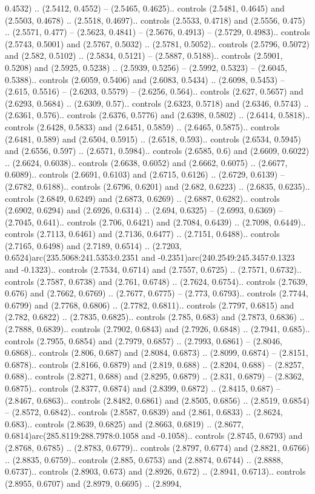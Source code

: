 0.4532) .. (2.5412, 0.4552) -- (2.5465, 0.4625).. controls (2.5481, 0.4645) and (2.5503, 0.4678) .. (2.5518, 0.4697).. controls (2.5533, 0.4718) and (2.5556, 0.475) .. (2.5571, 0.477) -- (2.5623, 0.4841) -- (2.5676, 0.4913) -- (2.5729, 0.4983).. controls (2.5743, 0.5001) and (2.5767, 0.5032) .. (2.5781, 0.5052).. controls (2.5796, 0.5072) and (2.582, 0.5102) .. (2.5834, 0.5121) -- (2.5887, 0.5188).. controls (2.5901, 0.5208) and (2.5925, 0.5238) .. (2.5939, 0.5256) -- (2.5992, 0.5323) -- (2.6045, 0.5388).. controls (2.6059, 0.5406) and (2.6083, 0.5434) .. (2.6098, 0.5453) -- (2.615, 0.5516) -- (2.6203, 0.5579) -- (2.6256, 0.564).. controls (2.627, 0.5657) and (2.6293, 0.5684) .. (2.6309, 0.57).. controls (2.6323, 0.5718) and (2.6346, 0.5743) .. (2.6361, 0.576).. controls (2.6376, 0.5776) and (2.6398, 0.5802) .. (2.6414, 0.5818).. controls (2.6428, 0.5833) and (2.6451, 0.5859) .. (2.6465, 0.5875).. controls (2.6481, 0.589) and (2.6504, 0.5915) .. (2.6518, 0.593).. controls (2.6534, 0.5945) and (2.6556, 0.597) .. (2.6571, 0.5984).. controls (2.6585, 0.6) and (2.6609, 0.6022) .. (2.6624, 0.6038).. controls (2.6638, 0.6052) and (2.6662, 0.6075) .. (2.6677, 0.6089).. controls (2.6691, 0.6103) and (2.6715, 0.6126) .. (2.6729, 0.6139) -- (2.6782, 0.6188).. controls (2.6796, 0.6201) and (2.682, 0.6223) .. (2.6835, 0.6235).. controls (2.6849, 0.6249) and (2.6873, 0.6269) .. (2.6887, 0.6282).. controls (2.6902, 0.6294) and (2.6926, 0.6314) .. (2.694, 0.6325) -- (2.6993, 0.6369) -- (2.7045, 0.641).. controls (2.706, 0.6421) and (2.7084, 0.6439) .. (2.7098, 0.6449).. controls (2.7113, 0.6461) and (2.7136, 0.6477) .. (2.7151, 0.6488).. controls (2.7165, 0.6498) and (2.7189, 0.6514) .. (2.7203, 0.6524)arc(235.5068:241.5353:0.2351 and -0.2351)arc(240.2549:245.3457:0.1323 and -0.1323).. controls (2.7534, 0.6714) and (2.7557, 0.6725) .. (2.7571, 0.6732).. controls (2.7587, 0.6738) and (2.761, 0.6748) .. (2.7624, 0.6754).. controls (2.7639, 0.676) and (2.7662, 0.6769) .. (2.7677, 0.6775) -- (2.773, 0.6793).. controls (2.7744, 0.6799) and (2.7768, 0.6806) .. (2.7782, 0.6811).. controls (2.7797, 0.6815) and (2.782, 0.6822) .. (2.7835, 0.6825).. controls (2.785, 0.683) and (2.7873, 0.6836) .. (2.7888, 0.6839).. controls (2.7902, 0.6843) and (2.7926, 0.6848) .. (2.7941, 0.685).. controls (2.7955, 0.6854) and (2.7979, 0.6857) .. (2.7993, 0.6861) -- (2.8046, 0.6868).. controls (2.806, 0.687) and (2.8084, 0.6873) .. (2.8099, 0.6874) -- (2.8151, 0.6878).. controls (2.8166, 0.6879) and (2.819, 0.688) .. (2.8204, 0.688) -- (2.8257, 0.688).. controls (2.8271, 0.688) and (2.8295, 0.6879) .. (2.831, 0.6879) -- (2.8362, 0.6875).. controls (2.8377, 0.6874) and (2.8399, 0.6872) .. (2.8415, 0.687) -- (2.8467, 0.6863).. controls (2.8482, 0.6861) and (2.8505, 0.6856) .. (2.8519, 0.6854) -- (2.8572, 0.6842).. controls (2.8587, 0.6839) and (2.861, 0.6833) .. (2.8624, 0.683).. controls (2.8639, 0.6825) and (2.8663, 0.6819) .. (2.8677, 0.6814)arc(285.8119:288.7978:0.1058 and -0.1058).. controls (2.8745, 0.6793) and (2.8768, 0.6785) .. (2.8783, 0.6779).. controls (2.8797, 0.6774) and (2.8821, 0.6766) .. (2.8835, 0.6759).. controls (2.885, 0.6753) and (2.8874, 0.6744) .. (2.8888, 0.6737).. controls (2.8903, 0.673) and (2.8926, 0.672) .. (2.8941, 0.6713).. controls (2.8955, 0.6707) and (2.8979, 0.6695) .. (2.8994, 